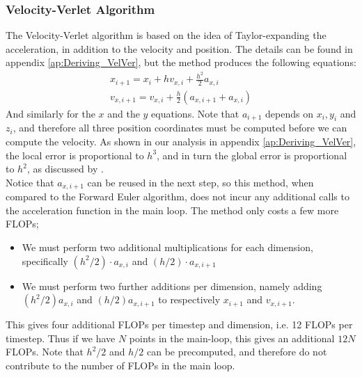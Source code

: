 \documentclass[a4paper, 10pt]{article}
\begin{document}
\subsubsection{Velocity-Verlet Algorithm}
The Velocity-Verlet algorithm is based on the idea of Taylor-expanding the acceleration, in addition to the velocity and position. The details can be found in appendix \ref{ap:Deriving_VelVer}, but the method produces the following equations:
\begin{equation} \label{eq:Vel_Ver_eq}
\begin{split}
x_{i+1}=x_i+hv_{x,i}+\frac{h^2}{2}a_{x,i}\\
v_{x,i+1}=v_{x,i}+\frac{h}{2}\left(a_{x,i+1}+a_{x,i}\right)
\end{split}
\end{equation}
And similarly for the $x$ and the $y$ equations. Note that $a_{i+1}$ depends on $x_i, y_i$ and $z_i$, and therefore all three position coordinates must be computed before we can compute the velocity. As shown in our analysis in appendix \ref{ap:Deriving_VelVer}, the local error is proportional to $h^3$, and in turn the global error is proportional to $h^2$, as discussed by \cite{Global_VV}. \\
\linebreak
Notice that $a_{x, i+1}$ can be reused in the next step, so this method, when compared to the Forward Euler algorithm, does not incur any additional calls to the acceleration function in the main loop. The method only costs a few more FLOPs;
\begin{itemize}
\item We must perform two additional multiplications for each dimension, specifically $(h^2/2)\cdot a_{x,i}$ and $(h/2)\cdot a_{x, i+1}$
\item We must perform two further additions per dimension, namely adding $(h^2/2)a_{x,i}$ and $(h/2)a_{x, i+1}$ to respectively $x_{i+1}$ and $v_{x, i+1}$.
\end{itemize} 
This gives four additional FLOPs per timestep and dimension, i.e. 12 FLOPs per timestep. Thus if we have $N$ points in the main-loop, this gives an additional $12N$ FLOPs. Note that $h^2/2$ and $h/2$ can be precomputed, and therefore do not contribute to the number of FLOPs in the main loop. 
\end{document}
